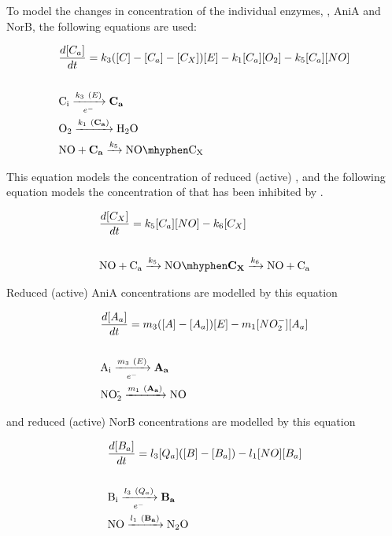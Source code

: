 To model the changes in concentration of the individual enzymes, \cbbthree{}, AniA and NorB, the following equations are used:

\begin{eqnarray}
&\frac{d[C_a]}{dt} = k_3([C] - [C_a] - [C_X])[E] - k_{1}[C_a][O_2] - k_5[C_a][NO] \nonumber \\\nonumber \\
&\textnormal{C$_\textnormal{i}$} \xrightarrow[e^-]{k_3~(E)} \mathbf{C_a} \nonumber \\
&\textnormal{O$_\textnormal{2}$} \xrightarrow{k_1~(\mathbf{C_a})} \textnormal{H$_\textnormal{2}$O} \nonumber \\
&\textnormal{NO} + \mathbf{C_a} \xrightarrow{k_5} \textnormal{NO}\mhyphen \textnormal{C$_\textnormal{X}$}
\label{eq:active_cbb3}
\end{eqnarray}

This equation models the concentration of reduced (active) \cbbthree{}, and the following equation models the concentration of \cbbthree{} that has been inhibited by \cNO{}.

\begin{eqnarray}
&\frac{d[C_X]}{dt} = k_5[C_a][NO] - k_6 [C_X] \nonumber \\\nonumber \\
&\textnormal{NO} + \textnormal{C$_\textnormal{a}$} \xrightarrow{k_5} \textnormal{NO}\mhyphen \mathbf{C_X} \xrightarrow{k_6} \textnormal{NO} + \textnormal{C$_\textnormal{a}$}
\label{eq:NO inhibited_cbb3}
\end{eqnarray}

Reduced (active) AniA concentrations are modelled by this equation

\begin{eqnarray}
&\frac{d[A_a]}{dt} = m_3([A] - [A_a])[E]- m_{1}[NO_2^-][A_a] \nonumber \\\nonumber \\
&\textnormal{A$_\textnormal{i}$} \xrightarrow[e^-]{m_3~(E)} \mathbf{A_a} \nonumber \\
&\textnormal{NO$_\textnormal{2}^\textnormal{-}$} \xrightarrow{m_1~(\mathbf{A_a})} \textnormal{NO}
\label{eq:active_ania}
\end{eqnarray}

and reduced (active) NorB concentrations are modelled by this equation

\begin{eqnarray}
&\frac{d[B_a]}{dt} = l_3[Q_a]([B] - [B_a]) - l_1[NO][B_a] \nonumber \\\nonumber \\
&\textnormal{B$_\textnormal{i}$} \xrightarrow[e^-]{l_3~(Q_a)} \mathbf{B_a} \nonumber \\
&\textnormal{NO} \xrightarrow{l_1~(\mathbf{B_a})} \textnormal{N$_\textnormal{2}$O}
\label{eq:active_norb}
\end{eqnarray}

